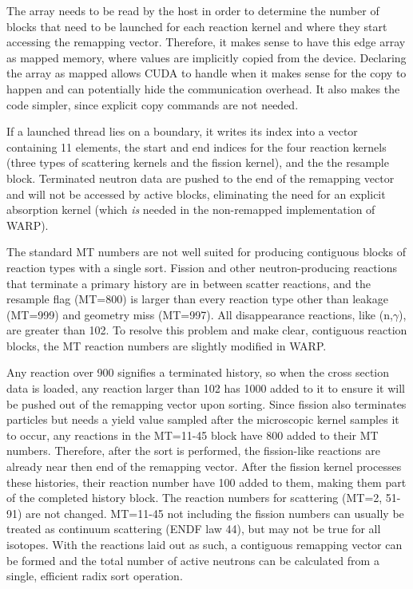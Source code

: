 The array %
needs to be read by the host in order to determine the number of blocks that need to be launched for each reaction kernel and where they%
 start accessing the remapping vector.  Therefore, it makes sense to have this edge array as mapped memory, where values are implicitly copied from the device.  Declaring the array as mapped allows CUDA to handle when it makes sense for the copy to happen and can potentially hide the communication overhead.  It also makes the code simpler, since explicit copy commands are not needed.  
 
If a launched thread lies on a boundary, it writes its index into a vector containing 11 elements, the start and end indices for the four reaction kernels (three types of scattering kernels and the fission kernel), and the the resample block.  Terminated neutron data are pushed to the end of the remapping vector and will not be accessed by active blocks, eliminating the need for an explicit absorption kernel (which \emph{is} needed in the non-remapped implementation of WARP).

The standard MT numbers are not well suited for producing contiguous blocks of reaction types with a single sort.  Fission and other neutron-producing reactions that terminate a primary history are in between scatter reactions, and the resample flag (MT=800) is larger than every reaction type other than leakage (MT=999) and geometry miss (MT=997).  All disappearance reactions, like (n,$\gamma$), are greater than 102.  To resolve this problem and make clear, contiguous reaction blocks, the MT reaction numbers are slightly modified in WARP.  

Any reaction over 900 signifies a terminated history, so when the cross section data is loaded, any reaction larger than 102 has 1000 added to it to ensure it will be pushed out of the remapping vector upon sorting.  Since fission also terminates particles but needs a yield value sampled after the microscopic kernel samples it to occur, any reactions in the MT=11-45 block have 800 added to their MT numbers.  Therefore, after the sort is performed, the fission-like reactions are already near then end of the remapping vector.  After the fission kernel processes these histories, their reaction number have 100 added to them, making them part of the completed history block.  The reaction numbers for scattering (MT=2, 51-91) are not changed. MT=11-45 not including the fission numbers can usually be treated as continuum scattering (ENDF law 44), but may not be true for all isotopes. With the reactions laid out as such, a contiguous remapping vector can be formed and the total number of active neutrons can be calculated from a single, efficient radix sort operation.  

